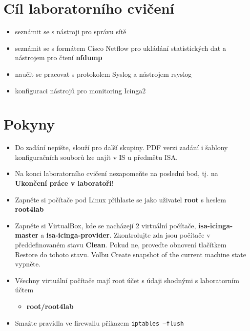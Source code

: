%
\section*{Cíl laboratorního cvičení}
\begin{itemize}
  \item seznámit se s nástroji pro správu sítě
  \item seznámit se s formátem Cisco Netflow pro ukládání statistických dat a nástrojem pro čtení \textbf{nfdump}
  \item naučit se pracovat s protokolem Syslog a nástrojem rsyslog
  \item konfiguraci nástrojů pro monitoring Icinga2
\end{itemize}

\section*{Pokyny}
\begin{itemize}
  \item Do zadání nepište, slouží pro další skupiny. PDF verzi zadání
  i šablony konfiguračních souborů lze najít v IS u předmětu ISA.
  
  \item Na konci laboratorního cvičení nezapomeňte na poslední bod,
  tj. na {\bf Ukončení práce v laboratoři}!
  
  \item Zapněte si počítače pod Linux přihlaste se jako uživatel \textbf{root} s heslem \textbf{root4lab}
  \item Zapněte si VirtualBox, kde se nacházejí 2 virtuální počítače, \textbf{isa-icinga-master} a \textbf{isa-icinga-provider}. Zkontrolujte zda jsou počítače v předdefinovaném stavu \textbf{Clean}. Pokud ne, proveďte obnovení tlačítkem Restore do tohoto stavu. Volbu Create snapshot of the current machine state vypněte.
  
  \item Všechny virtuální počítače mají root účet s údaji shodnými s laboratorním účtem
            \begin{itemize}
                \item \textbf{root/root4lab}
            \end{itemize}
  \item Smažte pravidla ve firewallu příkazem \texttt{iptables --flush}
\end{itemize}


